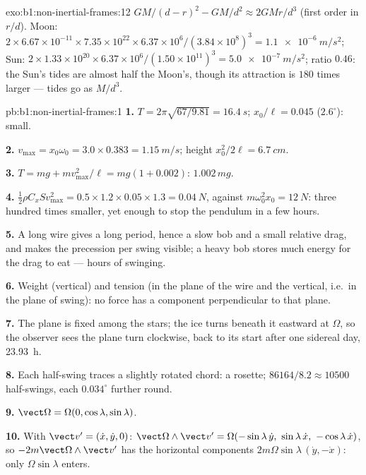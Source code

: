 \begin{solution}{exo:b1:non-inertial-frames:12}
$GM/(d - r)^2 - GM/d^2 \approx 2GMr/d^3$ (first order in $r/d$). Moon:
$2 \times 6.67\times10^{-11} \times 7.35\times10^{22} \times 6.37\times10^6/
(3.84\times10^8)^3 = \qty{1.1e-6}{m/s^2}$; Sun: $2 \times 1.33\times10^{20}
\times 6.37\times10^6/(1.50\times10^{11})^3 = \qty{5.0e-7}{m/s^2}$; ratio
$0.46$: the Sun's tides are almost half the Moon's, though its
attraction is $180$ times larger --- tides go as $M/d^3$.
\end{solution}

\begin{solution}{pb:b1:non-inertial-frames:1}
\textbf{1.} $T = 2\pi\sqrt{67/9.81} = \qty{16.4}{s}$; $x_0/\ell = 0.045$
($2.6^\circ$): small.

\textbf{2.} $v_{\max} = x_0\omega_0 = 3.0 \times 0.383 = \qty{1.15}{m/s}$; height
$x_0^2/2\ell = \qty{6.7}{cm}$.

\textbf{3.} $T = mg + mv_{\max}^2/\ell = mg(1 + 0.002)$: $1.002\,mg$.

\textbf{4.} $\tfrac12\rho C_xSv_{\max}^2 = 0.5 \times 1.2 \times 0.05 \times 1.3 =
\qty{0.04}{N}$, against $m\omega_0^2x_0 = \qty{12}{N}$: three hundred times
smaller, yet enough to stop the pendulum in a few hours.

\textbf{5.} A long wire gives a long period, hence a slow bob and a
small relative drag, and makes the precession per swing visible; a
heavy bob stores much energy for the drag to eat --- hours of swinging.

\textbf{6.} Weight (vertical) and tension (in the plane of the wire and
the vertical, i.e.\ in the plane of swing): no force has a component
perpendicular to that plane.

\textbf{7.} The plane is fixed among the stars; the ice turns beneath it
eastward at $\Omega$, so the observer sees the plane turn clockwise,
back to its start after one sidereal day, \qty{23.93}{h}.

\textbf{8.} Each half-swing traces a slightly rotated chord: a rosette;
$86164/8.2 \approx 10500$ half-swings, each $0.034^\circ$ further round.

\textbf{9.} $\vect\Omega = \Omega(0, \cos\lambda, \sin\lambda)$.

\textbf{10.} With $\vect v' = (\dot x, \dot y, 0)$:
$\vect\Omega\wedge\vect v' = \Omega(-\sin\lambda\,\dot y,\ \sin\lambda\,\dot x,\ -\cos\lambda\,\dot x)$,
so $-2m\vect\Omega\wedge\vect v'$ has the horizontal components
$2m\Omega\sin\lambda\,(\dot y, -\dot x)$: only $\Omega\sin\lambda$ enters.


\end{solution}
